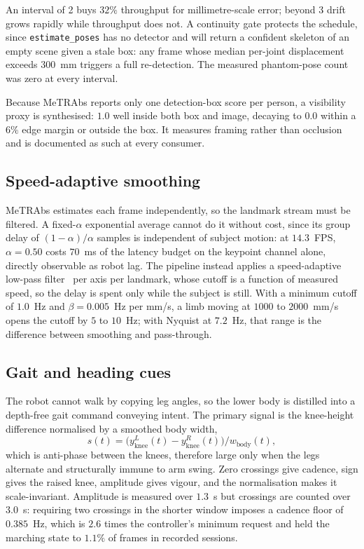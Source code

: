 \documentclass[twocolumn]{article}
\begin{document}
An interval of 2 buys $32\%$ throughput for millimetre-scale error; beyond 3 drift grows
rapidly while throughput does not. A continuity gate protects the schedule, since
\texttt{estimate\_poses} has no detector and will return a confident skeleton of an empty scene
given a stale box: any frame whose median per-joint displacement exceeds $300$~mm triggers a
full re-detection. The measured phantom-pose count was zero at every interval.

Because MeTRAbs reports only one detection-box score per person, a visibility proxy is
synthesised: $1.0$ well inside both box and image, decaying to $0.0$ within a $6\%$ edge margin
or outside the box. It measures framing rather than occlusion and is documented as such at
every consumer.

\subsection{Speed-adaptive smoothing}

MeTRAbs estimates each frame independently, so the landmark stream must be filtered. A
fixed-$\alpha$ exponential average cannot do it without cost, since its group delay of
$(1-\alpha)/\alpha$ samples is independent of subject motion: at $14.3$~FPS, $\alpha = 0.50$
costs $70$~ms of the latency budget on the keypoint channel alone, directly observable as robot
lag. The pipeline instead applies a speed-adaptive low-pass
filter~\cite{casiez2012oneeuro} per axis per landmark, whose cutoff is a function of measured
speed, so the delay is spent only while the subject is still. With a minimum cutoff of
$1.0$~Hz and $\beta = 0.005$~Hz per mm/s, a limb moving at $1000$ to $2000$~mm/s opens the
cutoff by $5$ to $10$~Hz; with Nyquist at $7.2$~Hz, that range is the difference between
smoothing and pass-through.

\subsection{Gait and heading cues}

The robot cannot walk by copying leg angles, so the lower body is distilled into a depth-free
gait command conveying intent. The primary signal is the knee-height difference normalised by a
smoothed body width,
\begin{equation}
s(t) = \big(y^{L}_{\text{knee}}(t) - y^{R}_{\text{knee}}(t)\big) \big/ w_{\text{body}}(t),
\label{eq:gaitsig}
\end{equation}
which is anti-phase between the knees, therefore large only when the legs alternate and
structurally immune to arm swing. Zero crossings give cadence, sign gives the raised knee,
amplitude gives vigour, and the normalisation makes it scale-invariant. Amplitude is measured
over $1.3$~s but crossings are counted over $3.0$~s: requiring two crossings in the shorter
window imposes a cadence floor of $0.385$~Hz, which is $2.6$ times the controller's minimum
request and held the marching state to $1.1\%$ of frames in recorded sessions.
\end{document}
